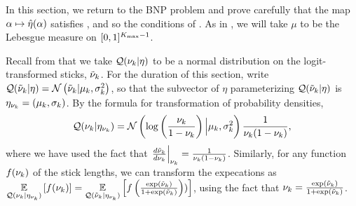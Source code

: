 In this section, we return to the BNP problem and prove carefully that the map
$\alpha \mapsto \hat\eta(\alpha)$ satisfies ,
and so the conditions of .  As in ,
we will take $\mu$ to be the Lebesgue measure on $[0,1]^{{K_{\mathrm{max}}} - 1}$.

Recall from  that we take $\mathcal{Q}(\nu_{k} \vert \eta)$ to be a normal
distribution on the logit-transformed sticks, $\tilde{\nu}_k$.  For the duration of
this section, write $\mathcal{Q}(\tilde{\nu}_{k} \vert \eta) = \mathcal{N}\left(\tilde{\nu}_{k} \vert \mu_k,
\sigma^2_k\right)$, so that the subvector of $\eta$ parameterizing $\mathcal{Q}(\tilde{\nu}_{k} \vert
\eta)$ is $\eta_{\nu_{k}} = (\mu_k, \sigma_k)$.
%
By the formula for transformation of probability densities,
%
\begin{align*}
%
\q(\nuk \vert \etanuk) =
    \normdist{\log\left(\frac{\nu_\k}{1 - \nu_\k} \right)
        \Big\vert  \mu_\k, \sigma^2_\k}
    \frac{1}{\nuk (1 - \nuk)},
%
\end{align*}
%
where we have used the fact that $\left.\frac{d \tilde{\nu}_k}{ d\nu_{k}}\right\vert_{\nu_{k}} =
\frac{1}{\nu_{k} (1 - \nu_{k})}$.  Similarly, for any function $f(\nu_{k})$ of the stick
lengths, we can transform the expecations as $\underset{\mathcal{Q}(\nu_{k} \vert
\eta_{\nu_{k}})}{\mathbb{E}}\left[f(\nu_{k})\right] = \underset{\mathcal{Q}(\tilde{\nu}_{k} \vert \eta_{\nu_{k}})}{\mathbb{E}}\left[f\left(
\frac{\exp(\tilde{\nu}_{k})}{1 + \exp(\tilde{\nu}_{k})}  \right))\right]$, using the fact that
$\nu_{k} = \frac{\exp(\tilde{\nu}_{k})}{1 + \exp(\tilde{\nu}_{k})}$.

